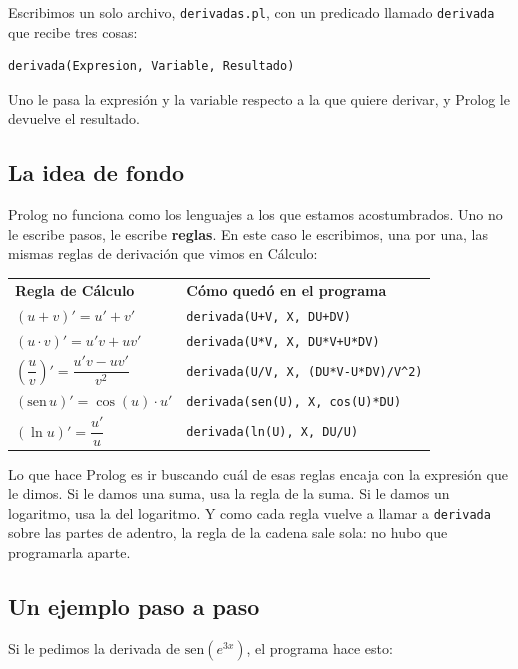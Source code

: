 \documentclass[11pt,letterpaper]{article}
\begin{document}
Escribimos un solo archivo, \texttt{derivadas.pl}, con un predicado llamado
\texttt{derivada} que recibe tres cosas:

\begin{lstlisting}
derivada(Expresion, Variable, Resultado)
\end{lstlisting}

Uno le pasa la expresión y la variable respecto a la que quiere derivar, y
Prolog le devuelve el resultado.

\subsection{La idea de fondo}

Prolog no funciona como los lenguajes a los que estamos acostumbrados. Uno no
le escribe pasos, le escribe \textbf{reglas}. En este caso le escribimos, una
por una, las mismas reglas de derivación que vimos en Cálculo:

\begin{center}
\renewcommand{\arraystretch}{1.8}
\begin{tabular}{ll}
\textbf{Regla de Cálculo} & \textbf{Cómo quedó en el programa} \\
$(u+v)' = u' + v'$ & \texttt{derivada(U+V, X, DU+DV)} \\
$(u \cdot v)' = u'v + uv'$ & \texttt{derivada(U*V, X, DU*V+U*DV)} \\
$\left(\dfrac{u}{v}\right)' = \dfrac{u'v - uv'}{v^2}$ & \texttt{derivada(U/V, X, (DU*V-U*DV)/V\^{}2)} \\
$(\mathrm{sen}\,u)' = \cos(u) \cdot u'$ & \texttt{derivada(sen(U), X, cos(U)*DU)} \\
$(\ln u)' = \dfrac{u'}{u}$ & \texttt{derivada(ln(U), X, DU/U)} \\
\end{tabular}
\end{center}

Lo que hace Prolog es ir buscando cuál de esas reglas encaja con la expresión
que le dimos. Si le damos una suma, usa la regla de la suma. Si le damos un
logaritmo, usa la del logaritmo. Y como cada regla vuelve a llamar a
\texttt{derivada} sobre las partes de adentro, la regla de la cadena sale sola:
no hubo que programarla aparte.

\subsection{Un ejemplo paso a paso}

Si le pedimos la derivada de $\mathrm{sen}(e^{3x})$, el programa hace esto:
\end{document}
